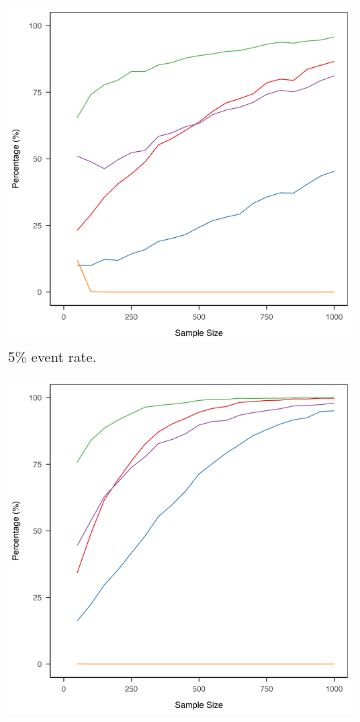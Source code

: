 \documentclass[AMA,STIX1COL]{WileyNJD-v5}
\begin{document}
\begin{figure}[h]
\centering
{}
\begin{subfigure}[b]{0.29\textwidth}
    \includegraphics[width=\textwidth]{"experiment_1/plot.05.png"}
    \caption{5\% event rate.}
    \label{fig:sub-1-figure-2}
\end{subfigure}
\hspace{-0.1cm}
\begin{subfigure}[b]{0.29\textwidth}
    \includegraphics[width=\textwidth]{"experiment_1/plot.20.png"}

\end{subfigure}
\end{figure}
\end{document}
